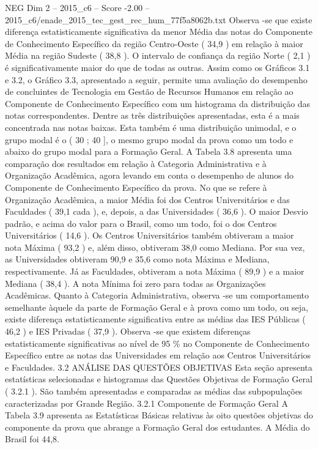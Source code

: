 \begin{textsample}{NEG Dim 2 – 2015\_c6 – Score -2.00 – 2015\_c6/enade\_2015\_tec\_gest\_rec\_hum\_77f5a8062b.txt}
Observa -se que existe diferença estatisticamente significativa da menor Média das notas do Componente de Conhecimento Específico da região Centro-Oeste ( 34,9 ) em relação à maior Média na região Sudeste ( 38,8 ).
O intervalo de confiança da região Norte ( 2,1 ) é significativamente maior do que de todas as outras.
Assim como os Gráficos 3.1 e 3.2, o Gráfico 3.3, apresentado a seguir, permite uma avaliação do desempenho de concluintes de Tecnologia em Gestão de Recursos Humanos em relação ao Componente de Conhecimento Específico com um histograma da distribuição das notas correspondentes.
Dentre as três distribuições apresentadas, esta é a mais concentrada nas notas baixas.
Esta também é uma distribuição unimodal, e o grupo modal é o ( 30 ; 40 ], o mesmo grupo modal da prova como um todo e abaixo do grupo modal para a Formação Geral.
A Tabela 3.8 apresenta uma comparação dos resultados em relação à Categoria Administrativa e à Organização Acadêmica, agora levando em conta o desempenho de alunos do Componente de Conhecimento Específico da prova.
No que se refere à Organização Acadêmica, a maior Média foi dos Centros Universitários e das Faculdades ( 39,1 cada ), e, depois, a das Universidades ( 36,6 ).
O maior Desvio padrão, e acima do valor para o Brasil, como um todo, foi o dos Centros Universitários ( 14,6 ).
Os Centros Universitários também obtiveram a maior nota Máxima ( 93,2 ) e, além disso, obtiveram 38,0 como Mediana.
Por sua vez, as Universidades obtiveram 90,9 e 35,6 como nota Máxima e Mediana, respectivamente.
Já as Faculdades, obtiveram a nota Máxima ( 89,9 ) e a maior Mediana ( 38,4 ).
A nota Mínima foi zero para todas as Organizações Acadêmicas.
Quanto à Categoria Administrativa, observa -se um comportamento semelhante àquele da parte de Formação Geral e à prova como um todo, ou seja, existe diferença estatisticamente significativa entre as médias das IES Públicas ( 46,2 ) e IES Privadas ( 37,9 ).
Observa -se que existem diferenças estatisticamente significativas ao nível de 95 \% no Componente de Conhecimento Específico entre as notas das Universidades em relação aos Centros Universitários e Faculdades. 3.2 ANÁLISE DAS QUESTÕES OBJETIVAS Esta seção apresenta estatísticas selecionadas e histogramas das Questões Objetivas de Formação Geral ( 3.2.1 ).
São também apresentadas e comparadas as médias das subpopulações caracterizadas por Grande Região. 3.2.1 Componente de Formação Geral A Tabela 3.9 apresenta as Estatísticas Básicas relativas às oito questões objetivas do componente da prova que abrange a Formação Geral dos estudantes.
A Média do Brasil foi 44,8.

\end{textsample}
